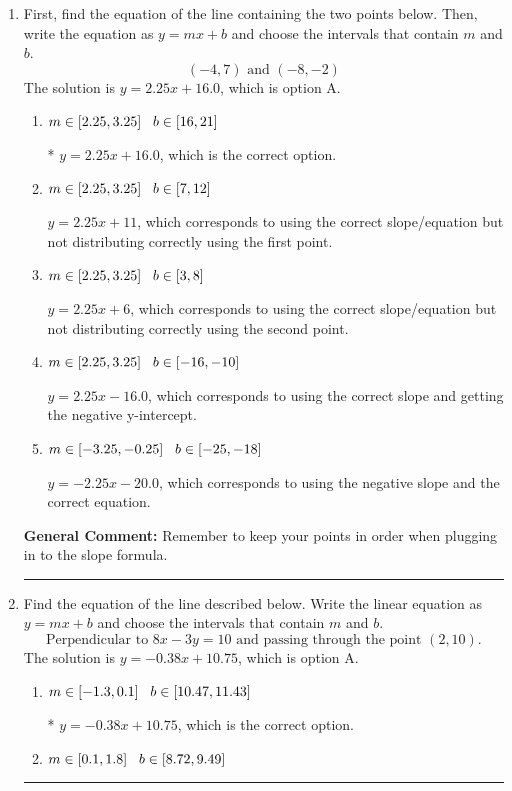 \documentclass{extbook}[14pt]
\newcommand{\litem}[1]{\item #1

\rule{\textwidth}{0.4pt}}
\begin{document}
\begin{enumerate}\litem{
First, find the equation of the line containing the two points below. Then, write the equation as $ y=mx+b $ and choose the intervals that contain $m$ and $b$.
\[ (-4, 7) \text{ and } (-8, -2) \]
The solution is \( y = 2.25x + 16.0 \), which is option A.\begin{enumerate}[label=\Alph*.]
\item \( m \in [2.25, 3.25] \hspace*{3mm} b \in [16, 21] \)

* $y = 2.25x + 16.0$, which is the correct option.
\item \( m \in [2.25, 3.25] \hspace*{3mm} b \in [7, 12] \)

 $y = 2.25x + 11$, which corresponds to using the correct slope/equation but not distributing correctly using the first point.
\item \( m \in [2.25, 3.25] \hspace*{3mm} b \in [3, 8] \)

 $y = 2.25x + 6$, which corresponds to using the correct slope/equation but not distributing correctly using the second point.
\item \( m \in [2.25, 3.25] \hspace*{3mm} b \in [-16, -10] \)

 $y = 2.25x -16.0$, which corresponds to using the correct slope and getting the negative y-intercept.
\item \( m \in [-3.25, -0.25] \hspace*{3mm} b \in [-25, -18] \)

 $y = -2.25x -20.0$, which corresponds to using the negative slope and the correct equation.
\end{enumerate}

\textbf{General Comment:} Remember to keep your points in order when plugging in to the slope formula.
}
\litem{
Find the equation of the line described below. Write the linear equation as $ y=mx+b $ and choose the intervals that contain $m$ and $b$.
\[ \text{Perpendicular to } 8 x - 3 y = 10 \text{ and passing through the point } (2, 10). \]
The solution is \( y = -0.38x + 10.75 \), which is option A.\begin{enumerate}[label=\Alph*.]
\item \( m \in [-1.3, 0.1] \hspace*{3mm} b \in [10.47, 11.43] \)

* $y = -0.38x + 10.75$, which is the correct option.
\item \( m \in [0.1, 1.8] \hspace*{3mm} b \in [8.72, 9.49] \)


\end{enumerate}}
\end{enumerate}
\end{document}
